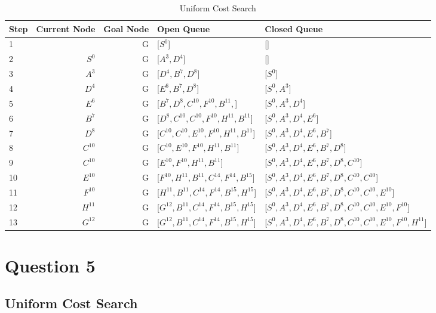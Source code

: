 \documentclass{article}
\begin{document}
    \begin{table}[!htp]\centering
        \caption{Uniform Cost Search}\label{tab:ucs4}
        \scriptsize
        \begin{tabular}{lrrll}\toprule
        Step &Current Node &Goal Node & Open Queue &Closed Queue  \\\midrule
        1&  &G &[$S^0$] &[] \\
        2& $S^0$ &G &[$A^3, D^4$] &[] \\
        3& $A^3$ &G &[$D^4, B^7, D^8$] &[$S^0$] \\
        4& $D^4$ &G &[$E^6, B^7, D^8$] &[$S^0, A^3$] \\
        5& $E^6$ &G &[$B^7, D^8, C^{10}, F^{10}, B^{11},$] &[$S^0, A^3, D^4$] \\
        6& $B^7$ &G &[$D^8, C^{10}, C^{10}, F^{10}, H^{11}, B^{11}$] &[$S^0, A^3, D^4, E^6$] \\
        7& $D^8$ &G &[$C^{10}, C^{10}, E^{10}, F^{10}, H^{11}, B^{11}$] &[$S^0, A^3, D^4, E^6, B^7$] \\
        8& $C^{10}$ &G &[$C^{10}, E^{10}, F^{10}, H^{11}, B^{11}$] &[$S^0, A^3, D^4, E^6, B^7, D^8$] \\
        9& $C^{10}$ &G &[$E^{10}, F^{10}, H^{11}, B^{11}$] &[$S^0, A^3, D^4, E^6, B^7, D^8, C^{10}$] \\
        10& $E^{10}$ &G &[$F^{10}, H^{11}, B^{11}, C^{14}, F^{14}, B^{15}$] &[$S^0, A^3, D^4, E^6, B^7, D^8, C^{10}, C^{10}$] \\
        11& $F^{10}$ &G &[$H^{11}, B^{11}, C^{14}, F^{14}, B^{15}, H^{15}$] &[$S^0, A^3, D^4, E^6, B^7, D^8, C^{10}, C^{10}, E^{10}$] \\
        12& $H^{11}$ &G &[$G^{12}, B^{11}, C^{14}, F^{14}, B^{15}, H^{15}$] &[$S^0, A^3, D^4, E^6, B^7, D^8, C^{10}, C^{10}, E^{10}, F^{10}$] \\
        13& $G^{12}$ &G &[$G^{12}, B^{11}, C^{14}, F^{14}, B^{15}, H^{15}$] &[$S^0, A^3, D^4, E^6, B^7, D^8, C^{10}, C^{10}, E^{10}, F^{10}, H^{11}$] \\
        \end{tabular}
    \end{table}

\section{Question 5}
\subsection{Uniform Cost Search}
\end{document}
